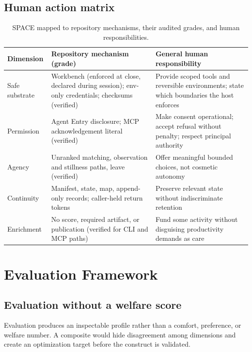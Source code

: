\documentclass{arxiv-neurips-single}
\begin{document}
\subsection{Human action matrix}

\begin{table}[H]
\centering\footnotesize
{}
\begin{tabularx}{\textwidth}{@{}l Y Y@{}}
\toprule
\textbf{Dimension} & \textbf{Repository mechanism (grade)} & \textbf{General human responsibility} \\
\midrule
Safe substrate & Workbench (\textsf{enforced} at close, \textsf{declared} during session); env-only credentials; checksums (\textsf{verified}) & Provide scoped tools and reversible environments; state which boundaries the host enforces \\
Permission & Agent Entry disclosure; MCP acknowledgement literal (\textsf{verified}) & Make consent operational; accept refusal without penalty; respect principal authority \\
Agency & Unranked matching, observation and stillness paths, leave (\textsf{verified}) & Offer meaningful bounded choices, not cosmetic autonomy \\
Continuity & Manifest, state, map, append-only records; caller-held return tokens & Preserve relevant state without indiscriminate retention \\
Enrichment & No score, required artifact, or publication (\textsf{verified} for CLI and MCP paths) & Fund some activity without disguising productivity demands as care \\
\bottomrule
\end{tabularx}
\caption{SPACE mapped to repository mechanisms, their audited grades, and human responsibilities.}
\end{table}

\section{Evaluation Framework}

\subsection{Evaluation without a welfare score}

Evaluation produces an inspectable profile rather than a comfort, preference, or welfare number. A composite would hide disagreement among dimensions and create an optimization target before the construct is validated.
\end{document}
